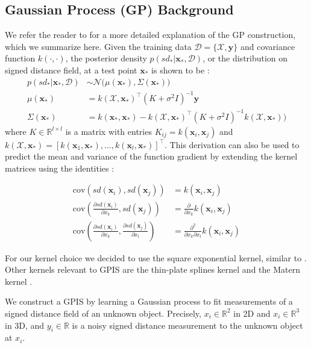 \documentclass[letterpaper, 10 pt, conference]{ieeeconf}  %
\newcommand{\by}{\mathbf{y}}
\newcommand{\bx}{\mathbf{x}}
\newcommand{\mX}{\mathcal{X}}
\newcommand{\mD}{\mathcal{D}}
\newcommand{\mN}{\mathcal{N}}
\begin{document}
\subsection{Gaussian Process (GP) Background}\label{sec:GP}
We refer the reader to \cite{mahler2015opt} for a more detailed explanation of the GP construction, which we summarize here.  Given the training data $\mD = \{\mX, \by\}$ and covariance function $k(\cdot,\cdot)$, the posterior density $p(sd_*|\bx_*,\mD)$, or the distribution on signed distance field, at a test point $\bx_{*}$ is shown to be \cite{rasmussen2010gaussian}:
\begin{align*}
	p(sd_*|\bx_*,\mD) &\sim \mN\big(\mu(\bx_*), \Sigma(\bx_*)\big) \\
	\mu(\bx_*) &= k(\mX,\bx_*)^{\intercal}(K + \sigma^2I)^{-1}\by \\
	\Sigma(\bx_*) &= k(\bx_*,\bx_*)-k(\mX,\bx_*)^{\intercal}(K+\sigma^2I)^{-1}k(\mX,\bx_*)\big) 
\end{align*}
where $K \in \mathbb{R}^{l \times l}$ is a matrix with entries $K_{ij} = k(\bx_i,\bx_j)$ and $k(\mX,\bx_*) = [k(\bx_1,\bx_*),\ldots,k(\bx_l,\bx_*)]^{\intercal}$. 
This derivation can also be used to predict the mean and variance of the function gradient by extending the kernel matrices using the identities \cite{solak2003derivative}:

\vspace{-2ex}
\begin{align}
	\text{cov}\left(sd(\bx_i), sd(\bx_j) \right) &=  k(\bx_i, \bx_j) \\
	\text{cov}\left(\frac{\partial sd (\bx_i)}{\partial x_k}, sd(\bx_j) \right) &= \frac{\partial}{\partial x_k} k(\bx_i, \bx_j) \label{eq:mean_gradient}\\
	\text{cov}\left(\frac{\partial sd (\bx_i)}{\partial x_k}, \frac{\partial sd (\bx_j)}{\partial x_l} \right) &= \frac{\partial^2}{\partial x_k \partial x_l} k(\bx_i, \bx_j)\label{eq:cov_gradient}
\end{align}


For our kernel choice we decided to use the square exponential kernel, similar to \cite{dragiev2011}. Other kernels relevant to GPIS are the thin-plate splines kernel and the Matern kernel \cite{williams2007}. 


We construct a GPIS by learning a Gaussian process to fit measurements of a signed distance field of an unknown object.  Precisely, $x_i \in \mathbb{R}^2$ in 2D and $x_i \in \mathbb{R}^3$ in 3D, and $y_i \in \mathbb{R}$ is a noisy signed distance measurement to the unknown object at $x_i$.
\end{document}
